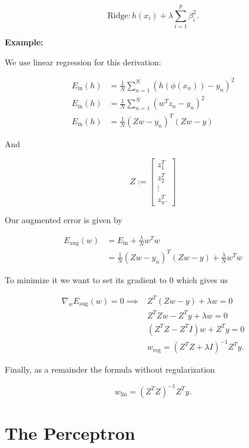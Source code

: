 \[
	\mathrm{Ridge}: h(x_i)  + \lambda \sum_{i = 1}^{p} \beta_i^2.
\]


\textbf{Example:}

We use linear regression for this derivation: 

\begin{align*}
	E_{\text{in}}(h) & = \frac{1}{N} \sum_{n = 1}^{N}(h(\phi(x_n)) - y_n)^2 \\
	E_{\text{in}}(h) & = \frac{1}{N} \sum_{n = 1}^{N}(w^Tz_n - y_n)^2       \\
	E_{\text{in}}(h) & = \frac{1}{N} (Zw - y_n)^T(Zw - y)
\end{align*}

And

\[
	Z := \begin{bmatrix}
		z_1^T \\ z_2^T \\ \vdots \\ z_{n}^T.
	\end{bmatrix}
\]

Our augmented error is given by

\begin{align*}
	E_{\text{aug}} (w) & = E_{\text{in}} + \frac{\lambda}{N} w^T w                    \\
	                   & = \frac{1}{N} (Zw - y_n)^T(Zw - y) + \frac{\lambda}{N} w^T w
\end{align*}

To minimize it we want to set its gradient to 0 which gives us

\begin{align*}
	\nabla_w E_{\text{aug}}(w) = 0 \implies & Z^T(Zw - y) + \lambda w = 0                     \\
	                                        & Z^TZw - Z^Ty + \lambda w = 0                    \\
	                                        & (Z^TZ - Z^T I)w + Z^T y= 0                      \\
	                                        & w_{\text{reg}} = (Z^T Z + \lambda I)^{-1} Z^T y.
\end{align*}

Finally, as a remainder the formula without regularization

\[
	w_{\text{lin}} = (Z^T Z)^{-1} Z^T y.
\]

\section{The Perceptron}

